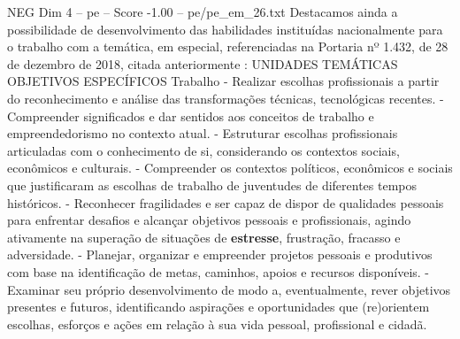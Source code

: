 \begin{textsample}{NEG Dim 4 – pe – Score -1.00 – pe/pe\_em\_26.txt}
Destacamos ainda a possibilidade de desenvolvimento das habilidades instituídas nacionalmente para o trabalho com a temática, em especial, referenciadas na Portaria nº 1.432, de 28 de dezembro de 2018, citada anteriormente : UNIDADES TEMÁTICAS OBJETIVOS ESPECÍFICOS Trabalho - Realizar escolhas profissionais a partir do reconhecimento e análise das transformações técnicas, tecnológicas recentes. - Compreender significados e dar sentidos aos conceitos de trabalho e empreendedorismo no contexto atual. - Estruturar escolhas profissionais articuladas com o conhecimento de si, considerando os contextos sociais, econômicos e culturais. - Compreender os contextos políticos, econômicos e sociais que justificaram as escolhas de trabalho de juventudes de diferentes tempos históricos. - Reconhecer fragilidades e ser capaz de dispor de qualidades pessoais para enfrentar desafios e alcançar objetivos pessoais e profissionais, agindo ativamente na superação de situações de \textbf{estresse}, frustração, fracasso e adversidade. - Planejar, organizar e empreender projetos pessoais e produtivos com base na identificação de metas, caminhos, apoios e recursos disponíveis. - Examinar seu próprio desenvolvimento de modo a, eventualmente, rever objetivos presentes e futuros, identificando aspirações e oportunidades que (re)orientem escolhas, esforços e ações em relação à sua vida pessoal, profissional e cidadã.

\end{textsample}
